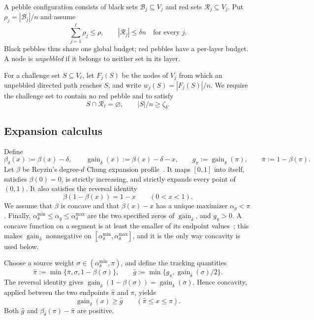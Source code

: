 \documentclass[11pt]{article}
\theoremstyle{plain}
\theoremstyle{remark}
\newcommand{\gaind}{\operatorname{gain}_{\delta}}
\newcommand{\gpi}{g_{\pi}}
\newcommand{\ghat}{\widehat g}
\newcommand{\pihat}{\widehat{\pi}}
\newcommand{\spend}[2]{\sum_{j=#1}^{#2}\rho_j}
\begin{document}
A pebble configuration consists of black sets \(\mathcal{B}_j\subseteq V_j\) and red sets
\(\mathcal{R}_j\subseteq V_j\).  Put \(\rho_j=|\mathcal{B}_j|/n\) and assume
\begin{equation}
  \spend{1}{\ell}\le\rho,
  \qquad |\mathcal{R}_j|\le\delta n\quad\text{for every }j.
  \label{eq:budgets}
\end{equation}
Black pebbles thus share one global budget; red pebbles have a per-layer budget.  A
node is \emph{unpebbled} if it belongs to neither set in its layer.

For a challenge set \(S\subseteq V_\ell\), let \(F_j(S)\) be the nodes of \(V_j\)
from which an unpebbled directed path reaches \(S\), and write
\(w_j(S)=|F_j(S)|/n\).  We require the challenge set to contain no red pebble and to satisfy
\begin{equation}
 S\cap \mathcal{R}_\ell=\varnothing,\qquad |S|/n\ge\zeta_\delta .
 \label{eq:challenge}
\end{equation}

\subsection{Expansion calculus}

Define
\[
 \beta_\delta(x):=\beta(x)-\delta,\qquad
 \gaind(x):=\beta(x)-\delta-x,\qquad
 \gpi:=\gaind(\pi),\qquad
 \bar\pi:=1-\beta(\pi).
\]
Let \(\beta\) be Reyzin's degree-\(d\) Chung expansion profile~\cite[Claim 11]{FOCS:Reyzin24}.
It maps \([0,1]\) into itself, satisfies \(\beta(0)=0\), is strictly increasing, and
strictly expands every point of \((0,1)\).  It also satisfies the reversal
identity~\cite[Claim 13]{FOCS:Reyzin24}
\begin{equation}
 \beta(1-\beta(x))=1-x\qquad(0<x<1).
 \label{eq:reversal}
\end{equation}
We assume that \(\beta\) is concave and that \(\beta(x)-x\) has a unique maximizer
\(\alpha_g<\pi\).  Finally,
\(\alpha_\delta^{\min}\le\alpha_g\le\alpha_\delta^{\max}\) are the two specified
zeros of \(\gaind\), and \(\gpi>0\).  A concave function on a segment is at least the
smaller of its endpoint values~\cite[Claim 15]{FOCS:Reyzin24}; this makes \(\gaind\)
nonnegative on \([\alpha_\delta^{\min},\alpha_\delta^{\max}]\), and it is the only way
concavity is used below.

Choose a source weight
\(\sigma\in(\alpha_\delta^{\min},\pi)\), and define the tracking quantities
\begin{equation}
 \pihat:=\min\{\bar\pi,\sigma,1-\beta(\sigma)\},
 \qquad
 \ghat:=\min\{\gpi,\gaind(\sigma)/2\}.
 \label{eq:tracking}
\end{equation}
The reversal identity gives
\(\gaind(1-\beta(\sigma))=\gaind(\sigma)\).  Hence concavity, applied between
the two endpoints \(\pihat\) and \(\pi\), yields
\begin{equation}
 \gaind(x)\ge\ghat\qquad(\pihat\le x\le\pi).
 \label{eq:tracking-gain}
\end{equation}
Both \(\ghat\) and \(\beta_\delta(\pi)-\pihat\) are positive.
\end{document}
